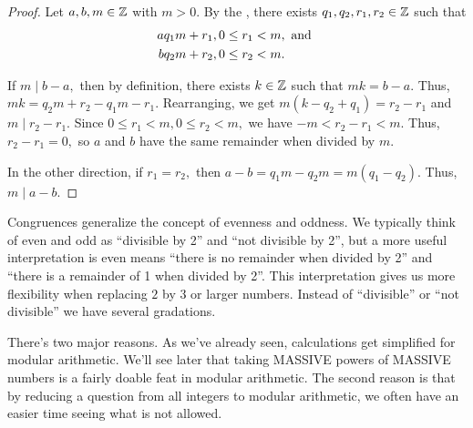 \documentclass{../ximera}
\begin{document}
\begin{proof}
Let $a,b,m\in\mathbb Z$ with $m> 0.$ By the , there exists $q_1,q_2,r_1,r_2\in\mathbb Z$ such that \begin{align*}
                    a & q_1 m +r_1, 0\leq r_1< m, \textnormal{ and }\\
                    b & q_2 m +r_2, 0\leq r_2< m.
                \end{align*}
            
            
                If $m\mid b-a,$ then by definition, there exists $k\in\mathbb Z$ such that $mk=b-a.$ Thus, $mk=q_2 m+r_2-q_1 m-r_1.$ Rearranging, we get 
                $m(k-q_2+q_1)=r_2-r_1$ and $m\mid r_2-r_1.$ Since 
                $0\leq r_1< m, 0\leq r_2< m,$ we have 
                $-m< r_2-r_1< m.$ Thus, $r_2-r_1=0,$ so $a$ and $b$ have the same remainder when divided by $m$.
            

            
                In the other direction, if $r_1=r_2,$ then $a-b=q_1 m-q_2 m=m(q_1-q_2).$ Thus, $m\mid a-b.$
\end{proof}

Congruences generalize the concept of evenness and oddness. We typically think of even and odd as ``divisible by 2'' and ``not divisible by 2'', but a more useful interpretation is even means ``there is no remainder when divided by 2'' and ``there is a remainder of 1 when divided by 2''. This interpretation gives us more flexibility when replacing $2$ by $3$ or larger numbers. Instead of ``divisible'' or ``not divisible'' we have several gradations.

There's two major reasons. As we've already seen, calculations get simplified for modular arithmetic. We'll see later that taking MASSIVE powers of MASSIVE numbers is a fairly doable feat in modular arithmetic. The second reason is that by reducing a question from all integers to modular arithmetic, we often have an easier time seeing what is not allowed. 
\end{document}
